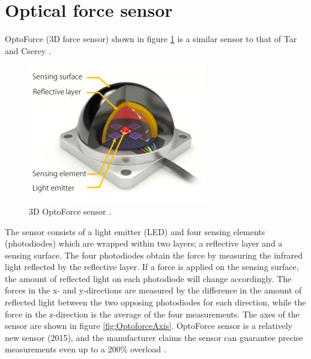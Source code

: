 \documentclass[USenglish]{ifimaster}  %
\begin{document}
\section{Optical force sensor}\label{sub:Optoforce}
OptoForce (3D force sensor) \cite{Optoforce} shown in figure \ref{fig:OptoforceBuild} is a similar sensor to that of Tar and Cserey \cite{6027100}. 

\begin{figure}[h]
	\centering
	\includegraphics[scale=0.8]{Figures/OptoforceBuild}
	\caption[3D OptoForce sensor]{3D OptoForce sensor \cite{OptoforceFig}.}
	\label{fig:OptoforceBuild}
\end{figure}
\FloatBarrier

The sensor consists of a light emitter (LED) and four sensing elements (photodiodes) which are wrapped within two layers; a reflective layer and a sensing surface. The four photodiodes obtain the force by measuring the infrared light reflected by the reflective layer. If a force is applied on the sensing surface, the amount of reflected light on each photodiode will change accordingly. The forces in the x- and y-directions are measured by the difference in the amount of reflected light between the two opposing photodiodes for each direction, while the force in the z-direction is the average of the four measurements. The axes of the sensor are shown in figure \ref{fig:OptoforceAxis}. OptoForce sensor is a relatively new sensor (2015), and the manufacturer claims the sensor can guarantee precise measurements even up to a 200\% overload \cite{Optoforce2}.
\end{document}
